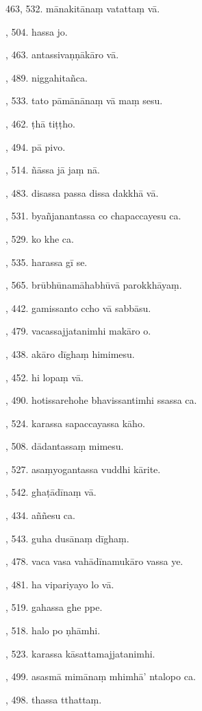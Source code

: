463, 532. mānakitānaṃ vatattaṃ vā.\par {}, 504. hassa jo.\par {}, 463. antassivaṇṇākāro vā.\par {}, 489. niggahitañca.\par {}, 533. tato pāmānānaṃ vā maṃ sesu.\par {}, 462. ṭhā tiṭṭho.\par {}, 494. pā pivo.\par {}, 514. ñāssa jā jaṃ nā.\par {}, 483. disassa passa dissa dakkhā vā.\par {}, 531. byañjanantassa co chapaccayesu ca.\par {}, 529. ko khe ca.\par {}, 535. harassa gī se.\par {}, 565. brūbhūnamāhabhūvā parokkhāyaṃ.\par {}, 442. gamissanto ccho vā sabbāsu.\par {}, 479. vacassajjatanimhi makāro o.\par {}, 438. akāro dīghaṃ himimesu.\par {}, 452. hi lopaṃ vā.\par {}, 490. hotissarehohe bhavissantimhi ssassa ca.\par {}, 524. karassa sapaccayassa kāho.\par {}, 508. dādantassaṃ mimesu.\par {}, 527. asaṃyogantassa vuddhi kārite.\par {}, 542. ghaṭādīnaṃ vā.\par {}, 434. aññesu ca.\par {}, 543. guha dusānaṃ dīghaṃ.\par {}, 478. vaca vasa vahādīnamukāro vassa ye.\par {}, 481. ha vipariyayo lo vā.\par {}, 519. gahassa ghe ppe.\par {}, 518. halo po ṇhāmhi.\par {}, 523. karassa kāsattamajjatanimhi.\par {}, 499. asasmā mimānaṃ mhimhā’ ntalopo ca.\par {}, 498. thassa tthattaṃ.\par \noindent
